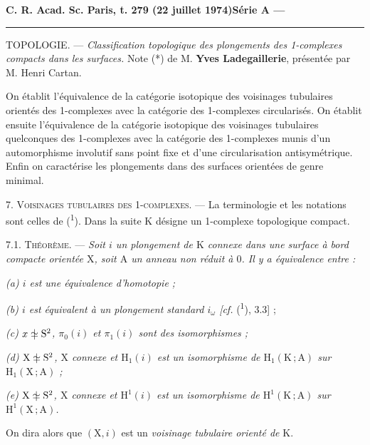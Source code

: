 \textbf{C. R. Acad. Sc. Paris, t. 279 (22 juillet 1974)}\hfill\textbf{Série A ---}\par\noindent\rule{\linewidth}{.35pt}\par

TOPOLOGIE. --- \textit{Classification topologique des plongements des 1-complexes compacts dans les surfaces.} Note (*) de M. \textbf{Yves Ladegaillerie}, présentée par M. Henri Cartan.

{\small On établit l'équivalence de la catégorie isotopique des voisinages tubulaires orientés des 1-complexes avec la catégorie des 1-complexes circularisés. On établit ensuite l'équivalence de la catégorie isotopique des voisinages tubulaires quelconques des 1-complexes avec la catégorie des 1-complexes munis d'un automorphisme involutif sans point fixe et d'une circularisation antisymétrique. Enfin on caractérise les plongements dans des surfaces orientées de genre minimal.}

7. \textsc{Voisinages tubulaires des 1-complexes.} --- La terminologie et les notations sont celles de (\textsuperscript{1}). Dans la suite \(\mathrm{K}\) désigne un 1-complexe topologique compact.

7.1. \textsc{Théorème.} --- \textit{Soit \(i\) un plongement de \(\mathrm{K}\) connexe dans une surface à bord compacte orientée \(\mathrm{X}\), soit \(\mathrm{A}\) un anneau non réduit à \(0\). Il y a équivalence entre :}

\textit{(a) \(i\) est une équivalence d'homotopie ;}

\textit{(b) \(i\) est équivalent à un plongement standard \(i_\omega\) [cf.} (\textsuperscript{1}), 3.3] ;

\textit{(c) \(x\mathrel{\ooalign{\hfil$\simeq$\hfil\cr\hfil$\vert$\hfil\cr}}\mathrm{S}^2\), \(\pi_0(i)\) \textup{et} \(\pi_1(i)\) sont des isomorphismes ;}

\textit{(d) \(\mathrm{X}\mathrel{\ooalign{\hfil$\simeq$\hfil\cr\hfil$\vert$\hfil\cr}}\mathrm{S}^2\), \(\mathrm{X}\) connexe et \(\mathrm{H}_1(i)\) est un isomorphisme de \(\mathrm{H}_1(\mathrm{K}\,;\mathrm{A})\) sur \(\mathrm{H}_1(\mathrm{X}\,;\mathrm{A})\) ;}

\textit{(e) \(\mathrm{X}\mathrel{\ooalign{\hfil$\simeq$\hfil\cr\hfil$\vert$\hfil\cr}}\mathrm{S}^2\), \(\mathrm{X}\) connexe et \(\mathrm{H}^1(i)\) est un isomorphisme de \(\mathrm{H}^1(\mathrm{K}\,;\mathrm{A})\) sur \(\mathrm{H}^1(\mathrm{X}\,;\mathrm{A})\).}

On dira alors que \((\mathrm{X},i)\) est un \textit{voisinage tubulaire orienté de} \(\mathrm{K}\).

